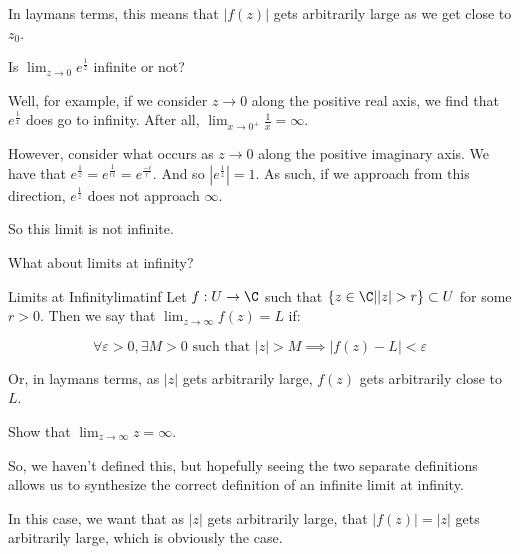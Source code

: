 In laymans terms, this means that $|f(z)|$ gets arbitrarily large as we get close to $z_0$.

\begin{ex}{}{} Is $\lim_{z\rightarrow 0} e^{\frac{1}{z}}$ infinite or not?

Well, for example, if we consider $z\rightarrow 0$ along the positive real axis, we find that $e^{\frac{1}{x}}$ does go to infinity. After all, $\lim_{x\rightarrow 0^+}\frac{1}{x}=\infty$.

However, consider what occurs as $z\rightarrow 0$ along the positive imaginary axis. We have that $e^{\frac{1}{z}} = e^{\frac{1}{ri}} = e^{\frac{-i}{r}}$. And so $|e^{\frac{1}{z}}| = 1$. As such, if we approach from this direction, $e^{\frac{1}{z}}$ does not approach $\infty$.

So this limit is not infinite.
\end{ex}

What about limits at infinity?

\begin{defbo}{Limits at Infinity}{limatinf}
Let $f:U\rightarrow \C$ such that $\{z\in \C| |z| > r\} \subset U$ for some $r > 0$. Then we say that $\lim_{z\rightarrow \infty} f(z) = L$ if:

$$\forall \varepsilon > 0, \exists M > 0 \text{ such that } |z| > M \implies |f(z) - L| < \varepsilon$$
\end{defbo}

Or, in laymans terms, as $|z|$ gets arbitrarily large, $f(z)$ gets arbitrarily close to $L$.

\begin{ex}{}{} Show that $\lim_{z\rightarrow \infty} z = \infty$.

So, we haven't defined this, but hopefully seeing the two separate definitions allows us to synthesize the correct definition of an infinite limit at infinity.

In this case, we want that as $|z|$ gets arbitrarily large, that $|f(z)| = |z|$ gets arbitrarily large, which is obviously the case.
\end{ex}